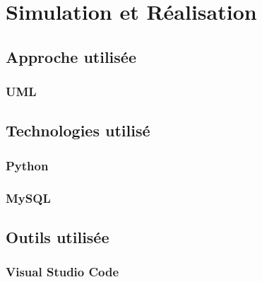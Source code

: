 \chapter{Simulation et Réalisation}
\section{Approche utilisée}
\subsection{UML}
\lipsum[1-2]

\section{Technologies utilisé}
\subsection{Python}
\lipsum[1-2]

\subsection{MySQL}
\lipsum[1-2]

\section{Outils utilisée}
\lipsum[1-2]

\subsection{Visual Studio Code}
\lipsum[1-2]